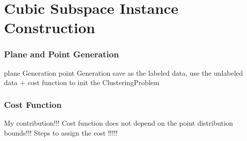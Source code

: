 \section{Cubic Subspace Instance Construction}
\frame{\tableofcontents[currentsection]}


\begin{frame}
    \frametitle{Plane and Point Generation}
    plane Generation
    point Generation
    save as the labeled data,
    use the unlabeled data + cost function to init the ClusteringProblem
\end{frame}


\begin{frame}
    \frametitle{Cost Function}
    My contribution!!! 
    Cost function does not depend on the point distribution bounds!!!
    Steps to assign the cost !!!!!
\end{frame}
